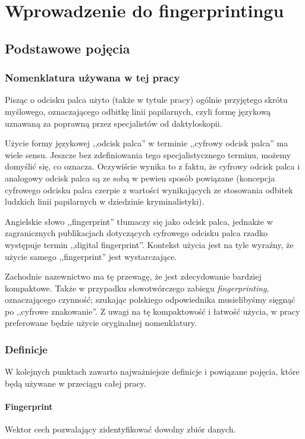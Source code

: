 \chapter{Wprowadzenie do fingerprintingu}

\section{Podstawowe pojęcia}

\subsection{Nomenklatura używana w tej pracy}
Pisząc o odcisku palca użyto (także w tytule pracy) ogólnie przyjętego skrótu
myślowego, oznaczającego odbitkę linii papilarnych, czyli formę językową
uznawaną za poprawną przez specjalistów od daktyloskopii.

Użycie formy językowej ,,odcisk palca'' w terminie ,,cyfrowy odcisk palca'' ma
wiele sensu. Jeszcze bez zdefiniowania tego specjalistycznego terminu, możemy
domyślić się, co oznacza. Oczywiście wynika to z faktu, że cyfrowy odcisk palca
i analogowy odcisk palca są ze sobą w pewien sposób powiązane (koncepcja
cyfrowego odcisku palca czerpie z wartości wynikających ze stosowania odbitek
ludzkich linii papilarnych w dziedzinie kryminalistyki).

Angielskie słowo ,,fingerprint'' tłumaczy się jako odcisk palca, jednakże w
zagranicznych publikacjach dotyczących cyfrowego odcisku palca rzadko występuje
termin ,,digital fingerprint''. Kontekst użycia jest na tyle wyraźny, że użycie
samego ,,fingerprint'' jest wystarczające.

Zachodnie nazewnictwo ma tę przewagę, że jest zdecydowanie bardziej kompaktowe.
Także w przypadku słowotwórczego zabiegu \emph{fingerprinting}, oznaczającego
czynność; szukając polskiego odpowiednika musielibyśmy sięgnąć po ,,cyfrowe
znakowanie''. Z uwagi na tę kompaktowość i łatwość użycia, w pracy preferowane
będzie użycie oryginalnej nomenklatury.

\subsection{Definicje}
W kolejnych punktach zawarto najważniejsze definicje i powiązane pojęcia, które
będą używane w przeciągu całej pracy.

\subsubsection{Fingerprint}
Wektor cech pozwalający zidentyfikować dowolny zbiór danych.

